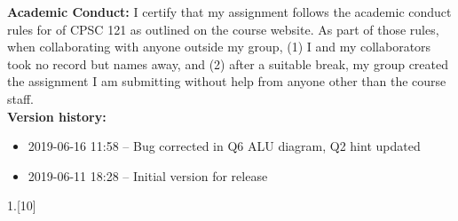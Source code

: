 \documentclass[a4paper, 20pt,fleqn]{article}
\begin{document}
\noindent\textbf{\LARGE Academic Conduct:} 
I certify that my assignment follows the academic conduct rules for of CPSC 121 as outlined on the course website. As part of those rules, when collaborating with anyone outside my group, (1) I and my collaborators took no record but names away, and (2) after a suitable break, my group created the assignment I am submitting without help from anyone other than the course staff. \\

\textbf{Version history:}
\begin{itemize}
    \item 2019-06-16 11:58 -- Bug corrected in Q6 ALU diagram, Q2 hint updated
    \item 2019-06-11 18:28 -- Initial version for release
\end{itemize} 

\usepackage{tikz}

\newpage
\normalsize

\newpage

\begin{Questions}

\newpage
\end{Questions}

\begin{question}{1.}[10]


\begin{Questions}
\newpage
\end{Questions}


\begin{Questions}
\newpage
\end{Questions}









\end{question}
\end{document}

